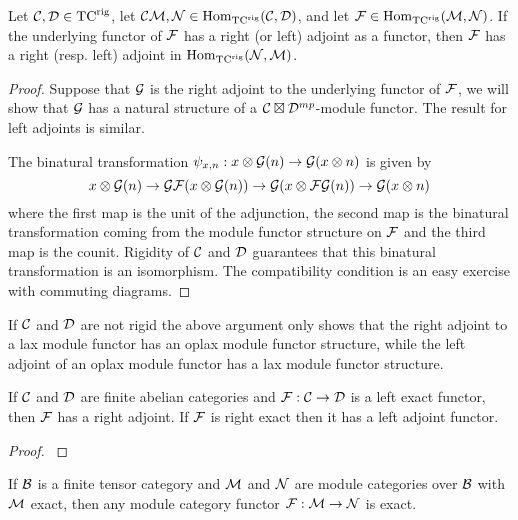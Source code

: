 \documentclass{amsart}
\begin{document}
\begin{lemma} \label{module-adjoint}
Let $\mathcal C, \mathcal D \in {\mathrm{TC}^{\text{rig}}}$, let $\mathcal C \mathcal M, \mathcal N \in \operatorname{Hom}_{\mathrm{TC}^{\text{rig}}}(\mathcal C,\mathcal D)$, and let $\mathcal F \in \operatorname{Hom}_{{\mathrm{TC}^{\text{rig}}}}(\mathcal M,\mathcal N)$.  If the underlying functor of $\mathcal F$ has a right (or left) adjoint as a functor, then $\mathcal F$ has a right (resp. left) adjoint in $\operatorname{Hom}_{{\mathrm{TC}^{\text{rig}}}}(\mathcal N,\mathcal M)$.
\end{lemma}
\begin{proof}
Suppose that $\mathcal G$ is the right adjoint to the underlying functor of $\mathcal F$, we will show that $\mathcal G$ has a natural structure of a $\mathcal C\boxtimes \mathcal D^{mp}$-module functor.  The result for left adjoints is similar.

The binatural transformation $\psi_{x,n}: x \otimes \mathcal G(n) \rightarrow \mathcal G(x \otimes n)$ is given by
$$x \otimes \mathcal G(n) \rightarrow \mathcal G \mathcal F(x \otimes \mathcal G(n)) \rightarrow \mathcal G(x \otimes \mathcal F\mathcal G(n)) \rightarrow \mathcal G(x \otimes n)$$
where the first map is the unit of the adjunction, the second map is the binatural transformation coming from the module functor structure on $\mathcal F$ and the third map is the counit.  Rigidity of $\mathcal C$ and $\mathcal D$ guarantees that this binatural transformation is an isomorphism.  The compatibility condition is an easy exercise with commuting diagrams.
\end{proof}

\begin{remark}
If $\mathcal C$ and $\mathcal D$ are not rigid the above argument only shows that the right adjoint to a lax module functor has an oplax module functor structure, while the left adjoint of an oplax module functor has a lax module functor structure.  
\end{remark}

\begin{proposition}
If $\mathcal C$ and $\mathcal D$ are finite abelian categories and $\mathcal F: \mathcal C \rightarrow \mathcal D$ is a left exact functor, then $\mathcal F$ has a right adjoint.  If $\mathcal F$ is right exact then it has a left adjoint functor.
\end{proposition}
\begin{proof}
\cite{???}
\end{proof}

\begin{proposition} \cite{???}
If $\mathcal B$ is a finite tensor category and $\mathcal M$ and $\mathcal N$ are module categories over $\mathcal B$ with $\mathcal M$ exact, then any module category functor $\mathcal F:\mathcal M \rightarrow \mathcal N$ is exact.
\end{proposition}
\end{document}
